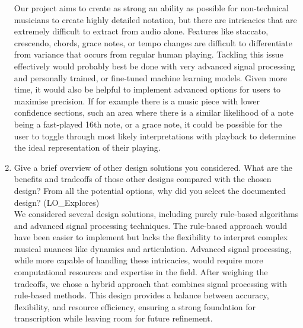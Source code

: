 \documentclass[12pt, titlepage]{article}
\begin{document}
\begin{enumerate}
    Our project aims to create as strong an ability as possible for non-technical musicians to create 
    highly detailed notation, but there are intricacies that are extremely difficult to extract from 
    audio alone. Features like staccato, crescendo, chords, grace notes, or tempo changes are difficult 
    to differentiate from variance that occurs from regular human playing. Tackling this issue effectively 
    would probably best be done with very advanced signal processing and personally trained, or fine-tuned 
    machine learning models. Given more time, it would also be helpful to implement advanced options for 
    users to maximise precision. If for example there is a music piece with lower confidence sections, such 
    an area where there is a similar likelihood of a note being a fast-played 16th note, or a grace note, 
    it could be possible for the user to toggle through most likely interpretations with playback to determine 
    the ideal representation of their playing. \\

  \item Give a brief overview of other design solutions you considered. What
  are the benefits and tradeoffs of those other designs compared with the chosen
  design?  From all the potential options, why did you select the documented design?
  (LO\_Explores) \\

    We considered several design solutions, including purely rule-based algorithms and advanced signal processing 
    techniques. The rule-based approach would have been easier to implement but lacks the flexibility to interpret 
    complex musical nuances like dynamics and articulation. Advanced signal processing, while more capable of handling 
    these intricacies, would require more computational resources and expertise in the field. After weighing the 
    tradeoffs, we chose a hybrid approach that combines signal processing with rule-based methods. This design provides 
    a balance between accuracy, flexibility, and resource efficiency, ensuring a strong foundation for transcription 
    while leaving room for future refinement.

\end{enumerate}
\end{document}
